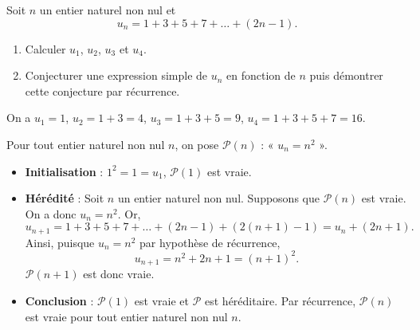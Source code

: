 \documentclass[11pt,fleqn]{book} %
\begin{document}
\begin{exercise}
Soit \(n\) un entier naturel non nul et \[u_n=1+3+5+7+\dots + (2n-1).\]
\begin{enumerate}
 	\item Calculer \(u_1\), \(u_2\), \(u_3\) et \(u_4\).
 	\item Conjecturer une expression simple de \(u_n\) en fonction de \(n\) puis démontrer cette conjecture par récurrence.
\end{enumerate}\end{exercise}
\begin{solution}On a \(u_1=1\), \(u_2=1+3=4\), \(u_3=1+3+5=9\), \(u_4=1+3+5+7=16\).

Pour tout entier naturel non nul \(n\), on pose \(\mathcal{P}(n)\) : « \(u_n=n^2\) ».
\begin{itemize} \item \textbf{Initialisation} : \( 1^2=1=u_1\), \( \mathcal{P}(1) \) est vraie.
\item \textbf{Hérédité} : Soit \(n\) un entier naturel non nul. Supposons que \( \mathcal{P}(n)\) est vraie. On a donc \(u_n=n^2\). Or,
\[u_{n+1}= 1+3+5+7+\dots + (2n-1)+(2(n+1)-1)=u_n + (2n+1).\]
Ainsi, puisque \(u_n=n^2\) par hypothèse de récurrence,
\[u_{n+1}=n^2+2n+1=(n+1)^2.\]\( \mathcal{P}(n+1)\) est donc vraie.
\item \textbf{Conclusion} : \(\mathcal{P}(1)\) est vraie et \(\mathcal{P}\) est héréditaire. Par récurrence, \(\mathcal{P}(n)\) est vraie pour tout entier naturel non nul \(n\).\end{itemize}\end{solution}
\end{document}
